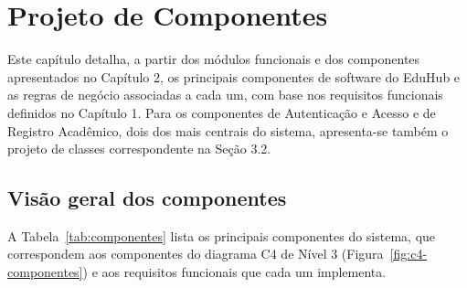 \chapter{Projeto de Componentes}

Este capítulo detalha, a partir dos módulos funcionais e dos componentes
apresentados no Capítulo 2, os principais componentes de software do EduHub e
as regras de negócio associadas a cada um, com base nos requisitos funcionais
definidos no Capítulo 1. Para os componentes de Autenticação e Acesso e de
Registro Acadêmico, dois dos mais centrais do sistema, apresenta-se também o
projeto de classes correspondente na Seção 3.2.

\section{Visão geral dos componentes}

A Tabela~\ref{tab:componentes} lista os principais componentes do sistema,
que correspondem aos componentes do diagrama C4 de Nível 3
(Figura~\ref{fig:c4-componentes}) e aos requisitos funcionais que cada um
implementa.

